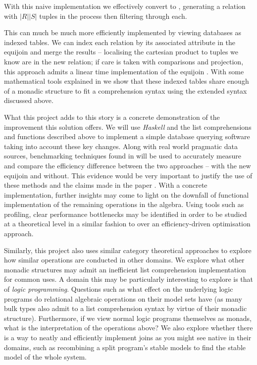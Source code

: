 With this naive implementation we effectively convert  to , generating a relation with $|R||S|$ tuples in the process then filtering through each.

This can much be much more efficiently implemented by viewing databases as indexed tables. We can index each relation by its associated attribute in the equijoin and merge the results -- localising the cartesian product to tuples we know are in the new relation; if care is taken with comparisons and projection, this approach admits a linear time implementation of the equijoin \cite{RelationalAlgebraByWayOfAdjunctions}. With some mathematical tools explained in  we show that these indexed tables share enough of a monadic structure to fit a comprehension syntax using the extended syntax discussed above.

What this project adds to this story is a concrete demonstration of the improvement this solution offers.
We will use \emph{Haskell} and the list comprehensions and functions described above to implement a simple database querying software taking into account these key changes. Along with real world pragmatic data sources, benchmarking techniques found in  will be used to accurately measure and compare the efficiency difference between the two approaches -- with the new equijoin and without. This evidence would be very important to justify the use of these methods and the claims made in the paper \cite{RelationalAlgebraByWayOfAdjunctions}.
With a concrete implementation, further insights may come to light on the downfall of functional implementation of the remaining operations in the algebra. Using tools such as profiling, clear performance bottlenecks may be identified in order to be studied at a theoretical level in a similar fashion to \cite{RelationalAlgebraByWayOfAdjunctions} over an efficiency-driven optimisation approach.

Similarly, this project also uses similar category theoretical approaches to explore how similar operations are conducted in other domains. We explore what other monadic structures may admit an inefficient list comprehension implementation for common uses. A domain this may be particularly interesting to explore is that of \emph{logic programming}. Questions such as what effect on the underlying logic programs do relational algebraic operations on their model sets have (as many bulk types also admit to a list comprehension syntax by virtue of their monadic structure). Furthermore, if we view normal logic programs themselves as monads, what is the interpretation of the operations above? We also explore whether there is a way to neatly and efficiently implement joins as you might see native in their domains, such as recombining a split program's stable models to find the stable model of the whole system.
